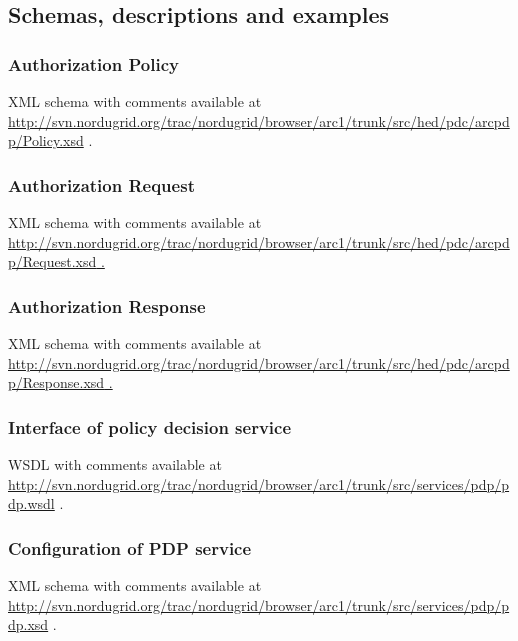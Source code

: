 \documentclass[a4paper]{article}
\newcommand\textstyleInternetlink[1]{\textcolor[rgb]{0.0,0.0,0.5019608}{#1}}
\begin{document}
\subsection[Schemas, descriptions and examples]{Schemas, descriptions
and examples}
\subsubsection[Authorization Policy]{Authorization Policy}
\label{bkm:Ref204009564}{\upshape\color{black}
XML schema with comments available at
\url{http://svn.nordugrid.org/trac/nordugrid/browser/arc1/trunk/src/hed/pdc/arcpdp/Policy.xsd}
.}

\subsubsection[Authorization Request]{Authorization Request}
\label{bkm:Ref204009595}{\upshape\color{black}
XML schema with comments available at
\url{http://svn.nordugrid.org/trac/nordugrid/browser/arc1/trunk/src/hed/pdc/arcpdp/Request.xsd}\href{http://svn.nordugrid.org/trac/nordugrid/browser/arc1/trunk/src/hed/pdc/arcpdp/Policy.xsd}{\textstyleInternetlink{
.}}}

\subsubsection{Authorization Response}
{\upshape\color{black}
XML schema with comments available at
\href{http://svn.nordugrid.org/trac/nordugrid/browser/arc1/trunk/src/hed/pdc/arcpdp/Request.xsd}{\textstyleInternetlink{http://svn.nordugrid.org/trac/nordugrid/browser/arc1/trunk/src/hed/pdc/arcpdp/Response.xsd}}\href{http://svn.nordugrid.org/trac/nordugrid/browser/arc1/trunk/src/hed/pdc/arcpdp/Policy.xsd}{\textstyleInternetlink{
.}}}

\subsubsection[Interface of policy decision service]{Interface of policy
decision service}
{\upshape\color{black}
WSDL with comments available at
\url{http://svn.nordugrid.org/trac/nordugrid/browser/arc1/trunk/src/services/pdp/pdp.wsdl}
.}

\subsubsection{Configuration of PDP service}
{\upshape\color{black}
XML schema with comments available at
\url{http://svn.nordugrid.org/trac/nordugrid/browser/arc1/trunk/src/services/pdp/pdp.xsd}
.}
\end{document}
